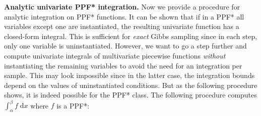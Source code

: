 \documentclass[letterpaper]{article}
\newcommand{\dd}{\;\mathrm{d}} %
\begin{document}
\noindent
{\bf Analytic univariate PPF* integration.} 
Now we provide a procedure for analytic integration on PPF* functions.
It can be shown that if in a PPF* all variables except one are instantiated, 
the resulting univariate function has a closed-form integral.  
This is sufficient for \emph{exact} Gibbs sampling since in each step, only one variable is uninstantiated.
However, we want to go a step further and compute univariate integrals of multivariate piecewise functions  
\emph{without} instantiating the remaining variables to avoid the need
for an integration per sample.
This may look impossible since in the latter case, the integration bounds depend on the values of uninstantiated conditions. 
But as the following procedure shows, it is indeed possible for the PPF* class.
The following procedure computes $\int_{\alpha}^\beta f \dd x$ where $f$ is a PPF*:
\end{document}
